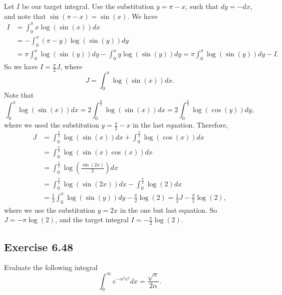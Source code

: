 Let $I$ be our target integral.
Use the substitution $y = \pi - x$, such that $dy = -dx$, and note that $\sin(\pi - x) = \sin(x)$.
We have
\begin{equation*}
    \begin{split}
        I &= \int_0^{\pi} x \log(\sin(x)) dx \\
            &= - \int_0^{\pi} (\pi - y) \log(\sin(y)) dy \\
            &= \pi \int_0^{\pi} \log(\sin(y)) dy - \int_0^{\pi} y \log(\sin(y)) dy
            = \pi \int_0^{\pi} \log(\sin(y)) dy - I.
    \end{split}
\end{equation*}
So we have $I = \frac{\pi}{2} J$, where
\begin{equation*}
    J = \int_{0}^{\pi} \log(\sin(x)) dx.
\end{equation*}
Note that
\begin{equation*}
    \int_0^{\pi} \log(\sin(x)) dx = 2 \int_0^{\frac{\pi}{2}} \log(\sin(x)) dx
        = 2 \int_0^{\frac{\pi}{2}} \log(\cos(y)) dy,
\end{equation*}
where we used the substitution $y = \frac{\pi}{2} - x$ in the last equation.
Therefore,
\begin{equation*}
    \begin{split}
        J &= \int_0^{\frac{\pi}{2}} \log(\sin(x)) dx + \int_0^{\frac{\pi}{2}} \log(\cos(x)) dx \\
            &= \int_0^{\frac{\pi}{2}} \log(\sin(x) \cos(x)) dx \\
            &= \int_0^{\frac{\pi}{2}} \log\left(\frac{\sin(2x)}{2}\right) dx \\
            &= \int_0^{\frac{\pi}{2}} \log(\sin(2x)) dx - \int_0^{\frac{\pi}{2}} \log(2) dx \\
            &= \frac{1}{2} \int_{0}^{\pi} \log(\sin(y)) dy - \frac{\pi}{2} \log(2)
            = \frac{1}{2} J - \frac{\pi}{2} \log(2),
    \end{split}
\end{equation*}
where we use the substitution $y = 2x$ in the one but last equation.
So $J = -\pi \log(2)$, and the target integral $I = -\frac{\pi}{2} \log(2)$.


\subsection*{Exercise 6.48}

Evaluate the following integral
\begin{equation*}
    \int_0^{\infty} e^{-\alpha^2 x^2} dx = \frac{\sqrt{\pi}}{2 \alpha}.
\end{equation*}

